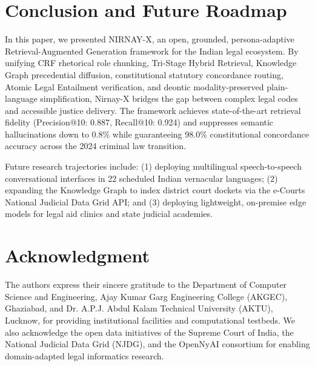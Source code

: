 \documentclass[conference]{IEEEtran}
\begin{document}
\section{Conclusion and Future Roadmap}
In this paper, we presented NIRNAY-X, an open, grounded, persona-adaptive Retrieval-Augmented Generation framework for the Indian legal ecosystem. By unifying CRF rhetorical role chunking, Tri-Stage Hybrid Retrieval, Knowledge Graph precedential diffusion, constitutional statutory concordance routing, Atomic Legal Entailment verification, and deontic modality-preserved plain-language simplification, Nirnay-X bridges the gap between complex legal codes and accessible justice delivery. The framework achieves state-of-the-art retrieval fidelity (Precision@10: 0.887, Recall@10: 0.924) and suppresses semantic hallucinations down to 0.8\% while guaranteeing 98.0\% constitutional concordance accuracy across the 2024 criminal law transition.

Future research trajectories include: (1) deploying multilingual speech-to-speech conversational interfaces in 22 scheduled Indian vernacular languages; (2) expanding the Knowledge Graph to index district court dockets via the e-Courts National Judicial Data Grid API; and (3) deploying lightweight, on-premise edge models for legal aid clinics and state judicial academies.

\section*{Acknowledgment}
The authors express their sincere gratitude to the Department of Computer Science and Engineering, Ajay Kumar Garg Engineering College (AKGEC), Ghaziabad, and Dr. A.P.J. Abdul Kalam Technical University (AKTU), Lucknow, for providing institutional facilities and computational testbeds. We also acknowledge the open data initiatives of the Supreme Court of India, the National Judicial Data Grid (NJDG), and the OpenNyAI consortium for enabling domain-adapted legal informatics research.
\end{document}
